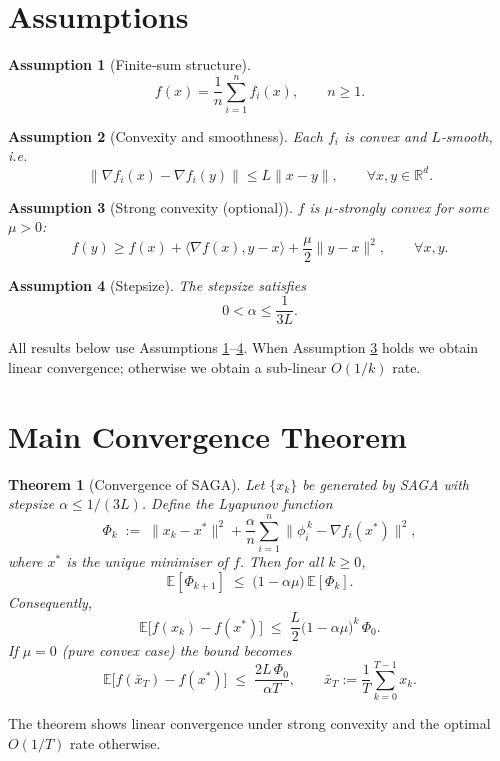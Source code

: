 \documentclass[11pt]{article}
\newtheorem{theorem}{Theorem}[section]
\newtheorem{assumption}{Assumption}[section]
\begin{document}
\section*{Assumptions}
\begin{assumption}[Finite‑sum structure]\label{ass:finite}
\[
f(x)=\frac1n\sum_{i=1}^{n}f_i(x),\qquad n\ge 1.
\]
\end{assumption}
\begin{assumption}[Convexity and smoothness]\label{ass:smooth}
Each $f_i$ is convex and $L$‑smooth, i.e.
\[
\|\nabla f_i(x)-\nabla f_i(y)\|\le L\|x-y\|,\qquad\forall x,y\in\mathbb{R}^d.
\]
\end{assumption}
\begin{assumption}[Strong convexity (optional)]\label{ass:strong}
$f$ is $\mu$‑strongly convex for some $\mu>0$:
\[
f(y)\ge f(x)+\langle\nabla f(x),y-x\rangle+\frac{\mu}{2}\|y-x\|^2,\qquad\forall x,y.
\]
\end{assumption}
\begin{assumption}[Stepsize]\label{ass:stepsize}
The stepsize satisfies 
\[
0<\alpha\le\frac{1}{3L}.
\]
\end{assumption}
All results below use Assumptions \ref{ass:finite}–\ref{ass:stepsize}.  
When Assumption \ref{ass:strong} holds we obtain linear convergence; otherwise we obtain a sub‑linear $O(1/k)$ rate.

\section*{Main Convergence Theorem}
\begin{theorem}[Convergence of SAGA]\label{thm:main}
Let $\{x_k\}$ be generated by SAGA with stepsize $\alpha\le 1/(3L)$.  
Define the Lyapunov function
\[
\Phi_k \;:=\; \|x_k-x^*\|^2+\frac{\alpha}{n}\sum_{i=1}^{n}\|\phi_i^{\,k}-\nabla f_i(x^*)\|^2,
\tag{4}
\]
where $x^*$ is the unique minimiser of $f$. Then for all $k\ge0$,
\[
\mathbb{E}[\Phi_{k+1}]\;\le\;\bigl(1-\alpha\mu\bigr)\,\mathbb{E}[\Phi_{k}].
\tag{5}
\]
Consequently,
\[
\mathbb{E}\bigl[f(x_k)-f(x^*)\bigr]\;\le\;\frac{L}{2}\bigl(1-\alpha\mu\bigr)^k\,\Phi_0 .
\tag{6}
\]
If $\mu=0$ (pure convex case) the bound becomes
\[
\mathbb{E}\bigl[f(\bar x_T)-f(x^*)\bigr]\;\le\;\frac{2L\,\Phi_0}{\alpha T},
\qquad\bar x_T:=\frac{1}{T}\sum_{k=0}^{T-1}x_k .
\tag{7}
\]
\end{theorem}
The theorem shows linear convergence under strong convexity and the optimal $O(1/T)$ rate otherwise.
\end{document}
